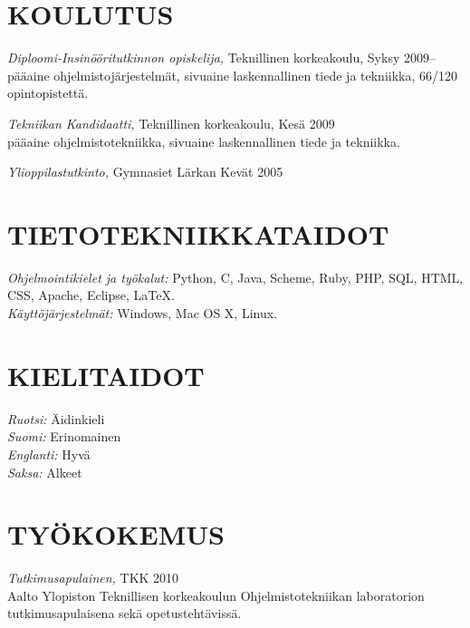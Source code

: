 \documentclass[line,margin]{res}
\begin{document}
\address{Servinkuja 5B52, 02150 Espoo. 040-7265959}
\address{\href{mailto:axel.eirola@gmail.com}{axel.eirola@gmail.com} \url{http://nonix.dy.fi/}}

 
\begin{resume}
 

\section{KOULUTUS} 
		{\sl Diploomi-Insinööritutkinnon opiskelija,} Teknillinen korkeakoulu, \hfill Syksy 2009-- \\
		pääaine ohjelmistojärjestelmät, sivuaine laskennallinen tiede ja tekniikka, 66/120 opinto\-pistettä.
		
		{\sl Tekniikan Kandidaatti,} Teknillinen korkeakoulu, \hfill Kesä 2009\\
		pääaine ohjelmistotekniikka, sivuaine laskennallinen tiede ja tekniikka.         	
		
		{\sl Ylioppilastutkinto,} Gymnasiet Lärkan 	\hfill Kevät 2005
 

\section{TIETO\-TEKNIIKKA\-TAIDOT}
		{\sl Ohjelmointikielet ja työkalut:} Python, C, Java, Scheme, Ruby, PHP, SQL, HTML, CSS, Apache, Eclipse, \LaTeX.  \\
		{\sl Käyttöjärjestelmät:} Windows, Mac OS X, Linux.

                
\section{KIELI\-TAIDOT}
		{\sl Ruotsi:} Äidinkieli \\
		{\sl Suomi:} Erinomainen \\
		{\sl Englanti:} Hyvä \\
		{\sl Saksa:} Alkeet

 
\section{TYÖKOKEMUS}
		{\sl Tutkimusapulainen,} TKK 	\hfill 2010 \\
			Aalto Ylopiston Teknillisen korkeakoulun Ohjelmistotekniikan laboratorion tutkimusapulaisena sekä opetustehtävissä.


\end{resume}
\end{document}
